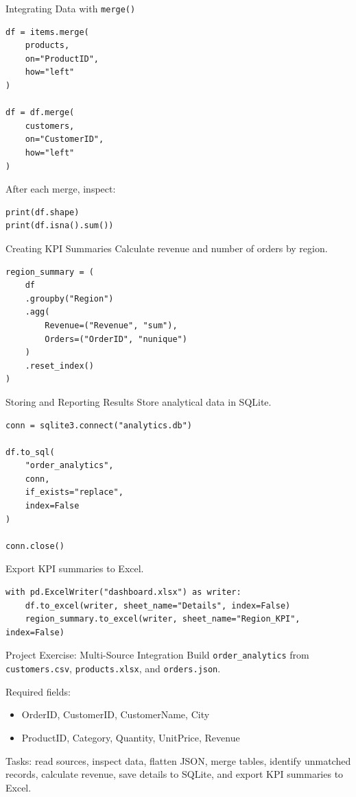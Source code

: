 \documentclass[aspectratio=169,11pt]{beamer}
\newcommand{\code}[1]{\texttt{#1}}
\begin{document}
\begin{frame}[fragile]{Integrating Data with \code{merge()}}
\begin{lstlisting}[style=pythonstyle]
df = items.merge(
    products,
    on="ProductID",
    how="left"
)

df = df.merge(
    customers,
    on="CustomerID",
    how="left"
)
\end{lstlisting}

After each merge, inspect:
\begin{lstlisting}[style=pythonstyle]
print(df.shape)
print(df.isna().sum())
\end{lstlisting}
\end{frame}

\begin{frame}[fragile]{Creating KPI Summaries}
Calculate revenue and number of orders by region.

\begin{lstlisting}[style=pythonstyle]
region_summary = (
    df
    .groupby("Region")
    .agg(
        Revenue=("Revenue", "sum"),
        Orders=("OrderID", "nunique")
    )
    .reset_index()
)
\end{lstlisting}
\end{frame}

\begin{frame}[fragile]{Storing and Reporting Results}
Store analytical data in SQLite.
\begin{lstlisting}[style=pythonstyle]
conn = sqlite3.connect("analytics.db")

df.to_sql(
    "order_analytics",
    conn,
    if_exists="replace",
    index=False
)

conn.close()
\end{lstlisting}

Export KPI summaries to Excel.
\begin{lstlisting}[style=pythonstyle]
with pd.ExcelWriter("dashboard.xlsx") as writer:
    df.to_excel(writer, sheet_name="Details", index=False)
    region_summary.to_excel(writer, sheet_name="Region_KPI", index=False)
\end{lstlisting}
\end{frame}

\begin{frame}{Project Exercise: Multi-Source Integration}
Build \code{order\_analytics} from \code{customers.csv}, \code{products.xlsx}, and \code{orders.json}.

Required fields:
\begin{itemize}
  \item OrderID, CustomerID, CustomerName, City
  \item ProductID, Category, Quantity, UnitPrice, Revenue
\end{itemize}

Tasks: read sources, inspect data, flatten JSON, merge tables, identify unmatched records, calculate revenue, save details to SQLite, and export KPI summaries to Excel.
\end{frame}
\end{document}
